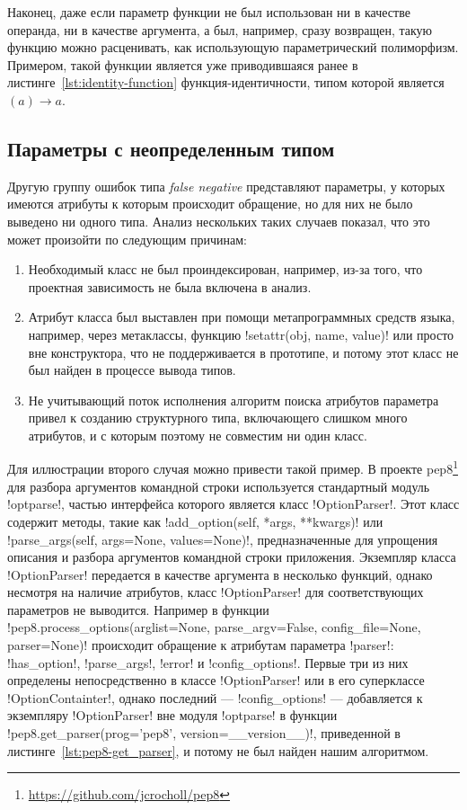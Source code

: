 Наконец, даже если параметр функции не был использован ни в качестве операнда,
ни в качестве аргумента, а был, например, сразу возвращен, такую функцию можно
расценивать, как использующую параметрический полиморфизм. Примером, такой
функции является уже приводившаяся ранее в листинге~\ref{lst:identity-function}
функция-идентичности, типом которой является $(a) \rightarrow a$.

\subsection{Параметры с неопределенным типом}
\label{sub:undefined-type-parameters}

Другую группу ошибок типа \emph{false negative} представляют параметры, у которых
имеются атрибуты к которым происходит обращение, но для них не было выведено ни
одного типа. Анализ нескольких таких случаев показал, что это может произойти по
следующим причинам:

\begin{enumerate}
    \item Необходимый класс не был проиндексирован, например, из-за того, что
      проектная зависимость не была включена в анализ.

    \item Атрибут класса был выставлен при помощи метапрограммных средств языка,
      например, через метаклассы, функцию !setattr(obj, name, value)! или просто
      вне конструктора, что не поддерживается в прототипе, и потому этот класс не был
      найден в процессе вывода типов.

    \item Не учитывающий поток исполнения алгоритм поиска атрибутов параметра
      привел к созданию структурного типа, включающего слишком много
      атрибутов, и с которым поэтому не совместим ни один класс.

\end{enumerate}

Для иллюстрации второго случая можно привести такой пример. В проекте
pep8\footnote{\url{https://github.com/jcrocholl/pep8}} для разбора аргументов
командной строки используется стандартный модуль !optparse!, частью интерфейса
которого является класс !OptionParser!. Этот класс содержит методы, такие как
!add_option(self, *args, **kwargs)! или !parse_args(self, args=None, values=None)!, 
предназначенные для упрощения описания и разбора аргументов командной строки
приложения. Экземпляр класса !OptionParser! передается в качестве аргумента в
несколько функций, однако несмотря на наличие атрибутов, 
класс !OptionParser! для соответствующих параметров не выводится. Например в функции 
!pep8.process_options(arglist=None, parse_argv=False, config_file=None, parser=None)! 
происходит обращение к атрибутам параметра !parser!: !has_option!,
!parse_args!, !error! и !config_options!. Первые три из них определены
непосредственно в классе !OptionParser! или в его суперклассе
!OptionContainter!, однако последний --- !config_options! --- добавляется к
экземпляру !OptionParser! вне модуля !optparse! в функции
!pep8.get_parser(prog='pep8', version=__version__)!, приведенной в
листинге~\ref{lst:pep8-get_parser}, и потому не был найден нашим алгоритмом.

